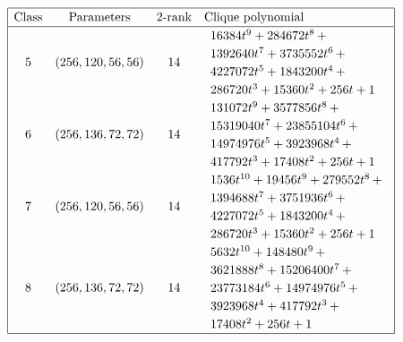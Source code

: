 \documentclass[12pt,a4paper]{article}
\begin{document}
\newpage
\begin{table}[!bhpt] %
\small{}
\begin{align*}
\def\arraystretch{1.2}
\begin{array}{|cccl|}
\hline
\text{Class} &
\text{Parameters} &
\text{2-rank} &
\text{Clique polynomial}
\\
\hline
5 &
(256, 120, 56, 56) &
14 &
\begin{array}{l}
16384t^{9} + 284672t^{8}
\,+
\\
 1392640t^{7} + 3735552t^{6}
\,+
\\
 4227072t^{5} + 1843200t^{4}
\,+
\\
 286720t^{3} + 15360t^{2} + 256t + 1
\end{array}
\\
6 &
(256, 136, 72, 72) &
14 &
\begin{array}{l}
131072t^{9} + 3577856t^{8}
\,+
\\
 15319040t^{7} + 23855104t^{6}
\,+
\\
 14974976t^{5} + 3923968t^{4}
\,+
\\
 417792t^{3} + 17408t^{2} + 256t + 1
\end{array}
\\
7 &
(256, 120, 56, 56) &
14 &
\begin{array}{l}
1536t^{10} + 19456t^{9} + 279552t^{8}
\,+
\\
 1394688t^{7} + 3751936t^{6}
\,+
\\
 4227072t^{5} + 1843200t^{4}
\,+
\\
 286720t^{3} + 15360t^{2} + 256t + 1
\end{array}
\\
8 &
(256, 136, 72, 72) &
14 &
\begin{array}{l}
5632t^{10} + 148480t^{9}
\,+
\\
 3621888t^{8} + 15206400t^{7}
\,+
\\
 23773184t^{6} + 14974976t^{5}
\,+
\\
 3923968t^{4} + 417792t^{3}
\,+
\\
 17408t^{2} + 256t + 1
\end{array}
\\
\hline
\end{array}
\end{align*}
\caption{$f_{8,5}$ extended Cayley classes (part 2)}
\label{tab-c8_5_EC_classes_2}
\end{table}
\end{document}
